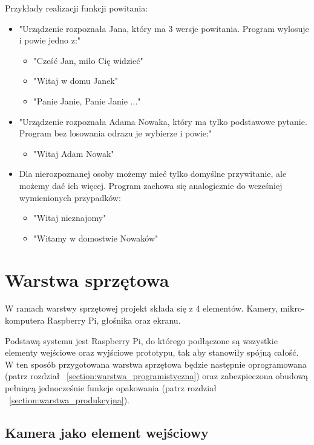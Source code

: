 \documentclass[a4paper,12pt,reqno]{article}
\begin{document}
Przykłady realizacji funkcji powitania:
\begin{itemize}
	\item "Urządzenie rozpoznała Jana, który ma 3 wersje powitania. Program wylosuje i powie jedno z:"
	\begin{itemize}
		\item "Cześć Jan, miło Cię widzieć"
		\item "Witaj w domu Janek"
		\item "Panie Janie, Panie Janie ..." %
	\end{itemize}
	\item "Urządzenie rozpoznała Adama Nowaka, który ma tylko podstawowe pytanie. Program bez losowania odrazu je wybierze i powie:"
	\begin{itemize}
		\item "Witaj Adam Nowak"
	\end{itemize}
	\item Dla nierozpoznanej osoby możemy mieć tylko domyślne przywitanie, ale możemy dać ich więcej. Program zachowa się analogicznie do wcześniej wymienionych przypadków:
	\begin{itemize}
		\item "Witaj nieznajomy"
		\item "Witamy w domostwie Nowaków"
	\end{itemize}
\end{itemize}

\newpage
\section{Warstwa sprzętowa} \label{section:warstwa_sprzetowa}

W ramach warstwy sprzętowej projekt składa się z 4 elementów. Kamery, mikro-komputera Raspberry Pi, głośnika oraz ekranu.

Podstawą systemu jest Raspberry Pi, do którego podłączone są wszystkie elementy wejściowe oraz wyjściowe prototypu, tak aby stanowiły spójną całość. W ten sposób przygotowana warstwa sprzętowa będzie następnie oprogramowana (patrz rozdział ~\ref{section:warstwa_programistyczna}) oraz zabezpieczona obudową pełniącą jednocześnie funkcje opakowania (patrz rozdział ~\ref{section:warstwa_produkcyjna}).

\subsection{Kamera jako element wejściowy}
\end{document}
